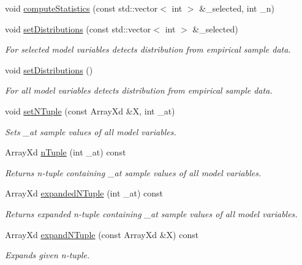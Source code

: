 \begin{DoxyCompactItemize}
void \hyperlink{class_go_s_u_m_1_1_c_model_variables_a4e7df5a62ff6c0eda6f0de196a704e12}{compute\-Statistics} (const std\-::vector$<$ int $>$ \&\-\_\-selected, int \-\_\-n)
\item 
void \hyperlink{class_go_s_u_m_1_1_c_model_variables_a8b7087357a18fbfaba390a47ce3ba309}{set\-Distributions} (const std\-::vector$<$ int $>$ \&\-\_\-selected)
\begin{DoxyCompactList}\small\item\em For selected model variables detects distribution from empirical sample data. \end{DoxyCompactList}\item 
void \hyperlink{class_go_s_u_m_1_1_c_model_variables_a8c5d6852c04dc7d5dcfdf49cdbb801a1}{set\-Distributions} ()
\begin{DoxyCompactList}\small\item\em For all model variables detects distribution from empirical sample data. \end{DoxyCompactList}\item 
void \hyperlink{class_go_s_u_m_1_1_c_model_variables_a75268d82c04c54ca4496ff5e1b1406ee}{set\-N\-Tuple} (const Array\-Xd \&X, int \-\_\-at)
\begin{DoxyCompactList}\small\item\em Sets \-\_\-at sample values of all model variables. \end{DoxyCompactList}\item 
Array\-Xd \hyperlink{class_go_s_u_m_1_1_c_model_variables_a92bd5ab6d1d46551a415a98541a2d32a}{n\-Tuple} (int \-\_\-at) const 
\begin{DoxyCompactList}\small\item\em Returns n-\/tuple containing \-\_\-at sample values of all model variables. \end{DoxyCompactList}\item 
Array\-Xd \hyperlink{class_go_s_u_m_1_1_c_model_variables_a8aca475f569e0e81bf88d697468cdf67}{expanded\-N\-Tuple} (int \-\_\-at) const 
\begin{DoxyCompactList}\small\item\em Returns expanded n-\/tuple containing \-\_\-at sample values of all model variables. \end{DoxyCompactList}\item 
Array\-Xd \hyperlink{class_go_s_u_m_1_1_c_model_variables_ad6d83d056cb740499c710711f3fcff1d}{expand\-N\-Tuple} (const Array\-Xd \&X) const 
\begin{DoxyCompactList}\small\item\em Expands given n-\/tuple. \end{DoxyCompactList}\item 

\end{DoxyCompactItemize}
